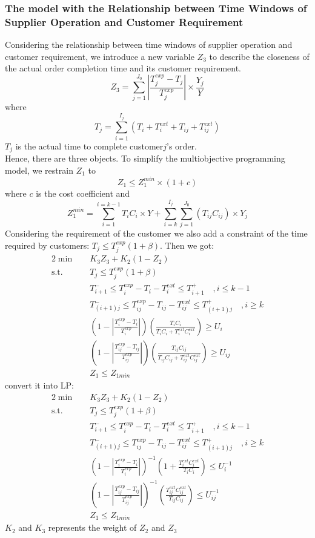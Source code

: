 \documentclass[12pt,a4paper]{article}
\begin{document}
\subsubsection{The model with the Relationship between Time Windows of Supplier Operation and Customer Requirement}
Considering the relationship between time windows of supplier operation and customer requirement, we introduce a new variable $Z_3$ to describe the closeness of the actual order completion time and its customer requirement.
\begin{equation}
	Z_3=\sum_{j=1}^{J_0}|\frac{T_j^{exp}-T_j}{T_j^{exp}}|\times\frac{Y_j}{Y}
\end{equation}
where
\begin{equation}
	T_j=\sum_{i=1}^{I_j}(T_i+T_i^{ext}+T_{ij}+T_{ij}^{ext})
\end{equation}
$T_j$ is the actual time to complete customer$j$'s order.\\
Hence, there are three objects. To simplify the multiobjective programming model, we restrain $Z_1$ to
\begin{equation}
 Z_1\leq Z_1^{min}\times(1+c)
\end{equation}
where $c$ is the cost coefficient and
\begin{equation}
Z_1^{min}= \sum_{i=1}^{i=k-1}T_iC_i\times Y+\sum_{i=k}^{I_j}\sum_{j=1}^{J_0}(T_{ij}C_{ij})\times Y_j
\end{equation}
Considering the requirement of the customer we also add a constraint of the time required by customers: $T_j\leq T_j^{exp}(1+\beta)$. Then we got:
\begin{alignat}{2}
\min \quad & K_3Z_3+K_2(1-Z_2)\\
\mbox{s.t.}\quad
& T_j\leq T_j^{exp}(1+\beta)\\
& T_{i+1}^-\leq T_i^{exp}-T_i-T_i^{ext}\leq T_{i+1}^+ \quad ,i\leq k-1\\
& T_{(i+1)j}^-\leq T_{ij}^{exp}-T_{ij}-T_{ij}^{ext}\leq T_{(i+1)j}^+ \quad, i\geq k\\
& (1-|\frac{T_i^{exp}-T_i}{T_i^{exp}}|)(\frac{T_iC_i}{T_iC_i+T_i^{ext}C_i^{ext}})\geq U_i\\
& (1-|\frac{T_{ij}^{exp}-T_{ij}}{T_{ij}^{exp}}|)(\frac{T_{ij}C_{ij}}{T_{ij}C_{ij}+T_{ij}^{ext}C_{ij}^{ext}})\geq U_{ij}\\
& Z_1\leq Z_{1min}
\end{alignat}
convert it into LP:
\begin{alignat}{2}
\min \quad & K_3Z_3+K_2(1-Z_2)\\
\mbox{s.t.}\quad
& T_j\leq T_j^{exp}(1+\beta)\\
& T_{i+1}^-\leq T_i^{exp}-T_i-T_i^{ext}\leq T_{i+1}^+ \quad ,i\leq k-1\\
& T_{(i+1)j}^-\leq T_{ij}^{exp}-T_{ij}-T_{ij}^{ext}\leq T_{(i+1)j}^+ \quad, i\geq k\\
& (1-|\frac{T_i^{exp}-T_i}{T_i^{exp}}|)^{-1}(1+\frac{T_i^{ext}C_i^{ext}}{T_iC_i})\leq U_i^{-1}\\
& (1-|\frac{T_{ij}^{exp}-T_{ij}}{T_{ij}^{exp}}|)^{-1}(\frac{T_{ij}^{ext}C_{ij}^{ext}}{T_{ij}C_{ij}})\leq U_{ij}^{-1}\\
& Z_1\leq Z_{1min}
\end{alignat}
$K_2$ and $K_3$ represents the weight of $Z_2$ and $Z_3$
\end{document}
